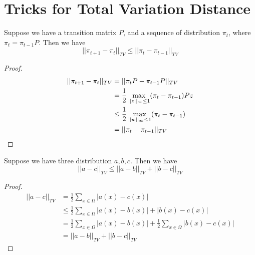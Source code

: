 \section{Tricks for Total Variation Distance}
\begin{proposition}
  Suppose we have a transition matrix $P$, and a sequence of distribution $\pi_t$, where $\pi_t = \pi_{t-1}P$.
  Then we have
  \[||\pi_{t+1} - \pi_t||_{TV} \leq ||\pi_t - \pi_{t-1}||_{TV}\]
\end{proposition}
\begin{proof}
  \begin{align*}
    ||\pi_{t+1} - \pi_t||_{TV} &= ||\pi_tP - \pi_{t-1}P||_{TV} \\
    &= \frac{1}{2}\max_{||z||_{\infty}\leq 1}(\pi_t - \pi_{t-1})Pz \\
    &\leq \frac{1}{2}\max_{||w||_{\infty}\leq 1} (\pi_t - \pi_{t-1}) \\
    &= ||\pi_t - \pi_{t-1}||_{TV} \qedhere
  \end{align*}
\end{proof}

\begin{proposition}
  Suppose we have three distribution $a, b, c$.
  Then we have
  \[||a - c||_{TV} \leq ||a - b||_{TV} + ||b - c||_{TV}\]
\end{proposition}
\begin{proof}
  \begin{align*}
    ||a - c||_{TV} &= \frac{1}{2}\sum_{x\in\Omega} |a(x) - c(x)| \\
    &\leq \frac{1}{2}\sum_{x\in\Omega} |a(x) - b(x)| + |b(x) - c(x)| \\
    &= \frac{1}{2}\sum_{x\in\Omega} |a(x) - b(x)| + \frac{1}{2}\sum_{x\in\Omega} |b(x) - c(x)| \\
    &= ||a - b||_{TV} + ||b - c||_{TV} 
  \end{align*}
\end{proof}

